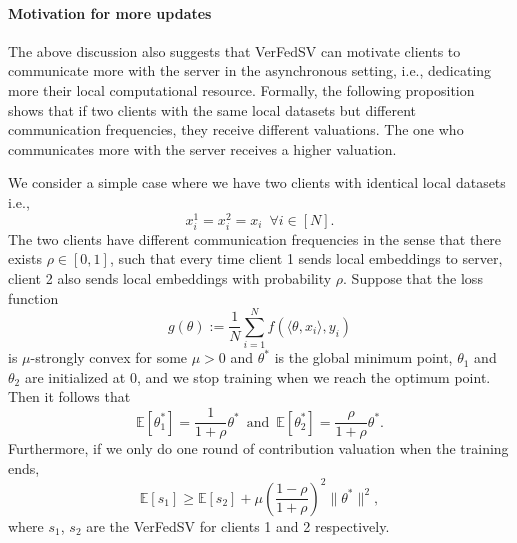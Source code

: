 \paragraph{Motivation for more updates}
The above discussion also suggests that VerFedSV can motivate clients to communicate more with the server in the asynchronous setting, i.e., dedicating more their local computational resource. Formally, the following proposition shows that if two clients with the same local datasets but different communication frequencies, they receive different valuations. The one who communicates more with the server receives a higher valuation.

\begin{proposition} \label{prop:asyn_diff_fre}
    We consider a simple case where we have two clients with identical local datasets i.e., 
    \[x_i^1 = x_i^2 = x_i \enspace \forall i \in [N].\]
    The two clients have different communication frequencies in the sense that there exists $\rho \in [0,1]$, such that every time client 1 sends local embeddings to server, client 2 also sends local embeddings with probability $\rho$.
    Suppose that the loss function
    \[g(\theta) := \frac{1}{N}\sum_{i=1}^N f(\langle \theta, x_i \rangle, y_i)\]
    is $\mu$-strongly convex for some $\mu>0$ and $\theta^*$ is the global minimum point, $\theta_1$ and $\theta_2$ are initialized at $0$, and we stop training when we reach the optimum point. Then it follows that 
    \[\mathbb{E}[\theta_1^*] = \frac{1}{1+\rho}\theta^* \enspace\text{and}\enspace \mathbb{E}[\theta_2^*] = \frac{\rho}{1+\rho}\theta^*.\]
    Furthermore, if we only do one round of contribution valuation when the training ends, 
    \[\mathbb{E}[s_1] \geq \mathbb{E}[s_2] + \mu\left(\frac{1-\rho}{1+\rho}\right)^2\|\theta^*\|^2,\]
    where $s_1$, $s_2$ are the VerFedSV for clients 1 and 2 respectively. 
\end{proposition}

